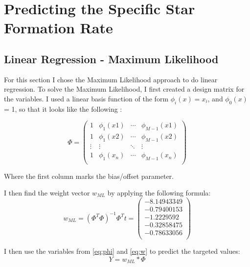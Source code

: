 \documentclass{article}
\theoremstyle{plain}
\theoremstyle{nonumberplain}
\begin{document}

\pagestyle{fancy}
\lhead{}
\chead{\leftmark}
\rhead{}
\cfoot{}

\section{Predicting the Specific Star Formation Rate}

\subsection{Linear Regression - Maximum Likelihood}

For this section I chose the Maximum Likelihood approach to do linear regression.
To solve the Maximum Likelihood, I first created a design matrix for the variables. 
I used a linear basis function of the form $\phi_i(x) = x_i$, and $\phi_0(x)$ = 1, so that it looks like the following : \medskip

\begin{equation} \label{eq:phi}
\Phi =
 \begin{pmatrix}
  1 & \phi_1(x1) & \cdots & \phi_{M-1}(x1) \\
  1 & \phi_1(x2) & \cdots & \phi_{M-1}(x2) \\
  \vdots  & \vdots  & \ddots & \vdots  \\
  1 & \phi_1(x_n) & \cdots & \phi_{M-1}(x_n) \\
 \end{pmatrix}
\end{equation}
\medskip

Where the first column marks the bias/offset parameter.

I then find the weight vector $w_{ML}$ by applying the following formula:
\medskip
\begin{equation} \label{eq:w}
w_{ML } =(\Phi^T \Phi)^{-1} \Phi^T t = 
\begin{pmatrix}
	-8.14943349 \\
	-0.79400153 \\
	-1.2229592  \\
	-0.32858475 \\
	-0.78633056 \\
\end{pmatrix}
\end{equation}

I then use the variables from \eqref{eq:phi} and \eqref{eq:w} to predict the targeted values:
\begin{equation}
Y = w_{ML} * \Phi
\end{equation}
\end{document}
